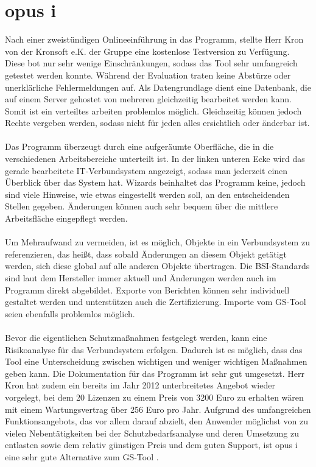 \section{opus i}
Nach einer zweistündigen Onlineeinführung in das Programm, stellte Herr Kron von der Kronsoft e.K. der Gruppe eine kostenlose Testversion zu Verfügung. Diese bot nur sehr wenige Einschränkungen, sodass das Tool sehr umfangreich getestet werden konnte. Während der Evaluation traten keine Abstürze oder unerklärliche Fehlermeldungen auf. Als Datengrundlage dient eine Datenbank, die auf einem Server gehostet von mehreren gleichzeitig bearbeitet werden kann. Somit ist ein verteiltes arbeiten problemlos möglich. Gleichzeitig können jedoch Rechte vergeben werden, sodass nicht für jeden alles ersichtlich oder änderbar ist. 
\\
\\
Das Programm überzeugt durch eine aufgeräumte Oberfläche, die in die verschiedenen Arbeitsbereiche unterteilt ist. In der linken unteren Ecke wird das gerade bearbeitete IT-Verbundsystem angezeigt, sodass man jederzeit einen Überblick über das System hat. Wizards beinhaltet das Programm keine, jedoch sind viele Hinweise, wie etwas eingestellt werden soll, an den entscheidenden Stellen gegeben. Änderungen können auch sehr bequem über die mittlere Arbeitsfläche eingepflegt werden.
\\
\\
Um Mehraufwand zu vermeiden, ist es möglich, Objekte in ein Verbundsystem zu referenzieren, das heißt, dass sobald Änderungen an diesem Objekt getätigt werden, sich diese global auf alle anderen Objekte übertragen. Die BSI-Standards sind laut dem Hersteller immer aktuell und Änderungen werden auch im Programm direkt abgebildet. Exporte von Berichten können sehr individuell gestaltet werden und unterstützen auch die Zertifizierung. Importe vom GS-Tool seien ebenfalls problemlos möglich.
\\
\\
Bevor die eigentlichen Schutzmaßnahmen festgelegt werden, kann eine Risikoanalyse für das Verbundsystem erfolgen. Dadurch ist es möglich, dass das Tool eine Unterscheidung zwischen wichtigen und weniger wichtigen Maßnahmen geben kann. Die Dokumentation für das Programm ist sehr gut umgesetzt. Herr Kron hat zudem ein bereits im Jahr 2012 unterbreitetes Angebot wieder vorgelegt, bei dem 20 Lizenzen zu einem Preis von 3200 Euro zu erhalten wären mit einem Wartungsvertrag über 256 Euro pro Jahr. Aufgrund des umfangreichen Funktionsangebots, das vor allem darauf abzielt, den Anwender möglichst von zu vielen Nebentätigkeiten bei der Schutzbedarfsanalyse und deren Umsetzung zu entlasten sowie dem relativ günstigen Preis und dem guten Support, ist opus i eine sehr gute Alternative zum GS-Tool \cite{opusi}.